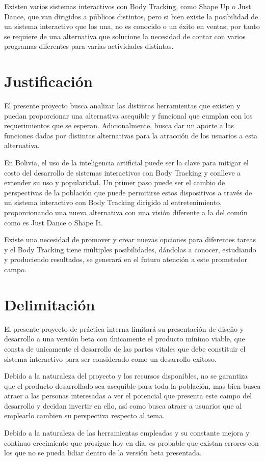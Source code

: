 Existen varios sistemas interactivos con Body Tracking, como Shape Up o Just Dance, que van dirigidos a públicos distintos, pero si bien existe la posibilidad de un sistema interactivo que los una, no es conocido o un éxito en ventas, por tanto se requiere de una alternativa que solucione la necesidad de contar con varios programas diferentes para varias actividades distintas.

\section{Justificación}

El presente proyecto busca analizar las distintas herramientas que existen y puedan proporcionar una alternativa asequible y funcional que cumplan con los requerimientos que se esperan. Adicionalmente, busca dar un aporte a las funciones dadas por distintas alternativas para la atracción de los usuarios a esta alternativa.

En Bolivia, el uso de la inteligencia artificial puede ser la clave para mitigar el costo del desarrollo de sistemas interactivos con Body Tracking y conlleve a extender su uso y popularidad. Un primer paso puede ser el cambio de perspectivas de la población que puede permitirse estos dispositivos a través de un sistema interactivo con Body Tracking dirigido al entretenimiento, proporcionando una nueva alternativa con una visión diferente a la del común como es Just Dance o Shape It.

Existe una necesidad de promover y crear nuevas opciones para diferentes tareas y el Body Tracking tiene múltiples posibilidades, dándolas a conocer, estudiando y produciendo resultados, se generará en el futuro atención a este prometedor campo.

\section{Delimitación}

El presente proyecto de práctica interna limitará su presentación de diseño y desarrollo a una versión beta con únicamente el producto mínimo viable, que consta de unicamente el desarrollo de las partes vitales que debe constituir el sistema interactivo para ser considerado como un desarrollo exitoso. 

Debido a la naturaleza del proyecto y los recursos disponibles, no se garantiza que el producto desarrollado sea asequible para toda la población, mas bien busca atraer a las personas interesadas a ver el potencial que presenta este campo del desarrollo y decidan invertir en ello, así como busca atraer a usuarios que al emplearlo cambien su perspectiva respecto al tema.

Debido a la naturaleza de las herramientas empleadas y su constante mejora y continuo crecimiento que prosigue hoy en día, es probable que existan errores con los que no se pueda lidiar dentro de la versión beta presentada.



